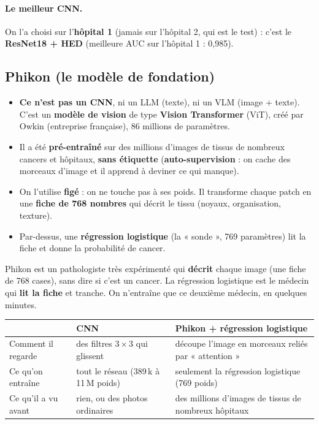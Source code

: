 \documentclass[11pt,a4paper]{article}
\begin{document}
\paragraph{Le meilleur CNN.} On l'a choisi sur l'\textbf{hôpital 1} (jamais sur l'hôpital 2, qui est le test) : c'est le
\textbf{ResNet18 + HED} (meilleure AUC sur l'hôpital 1 : 0,985).

\subsection{Phikon (le modèle de fondation)}
\begin{itemize}
  \item \textbf{Ce n'est pas un CNN}, ni un LLM (texte), ni un VLM (image + texte). C'est un \textbf{modèle de vision} de type
        \textbf{Vision Transformer} (ViT), créé par Owkin (entreprise française), 86 millions de paramètres.
  \item Il a été \textbf{pré-entraîné} sur des millions d'images de tissus de nombreux cancers et hôpitaux, \textbf{sans étiquette}
        (\textbf{auto-supervision} : on cache des morceaux d'image et il apprend à deviner ce qui manque).
  \item On l'utilise \textbf{figé} : on ne touche pas à ses poids. Il transforme chaque patch en une \textbf{fiche de 768 nombres}
        qui décrit le tissu (noyaux, organisation, texture).
  \item Par-dessus, une \textbf{régression logistique} (la « sonde », 769 paramètres) lit la fiche et donne la probabilité de cancer.
\end{itemize}

\begin{analogie}
Phikon est un pathologiste très expérimenté qui \textbf{décrit} chaque image (une fiche de 768 cases), sans dire si c'est un cancer.
La régression logistique est le médecin qui \textbf{lit la fiche} et tranche. On n'entraîne que ce deuxième médecin, en quelques minutes.
\end{analogie}

\begin{table}[H]
\centering\small
\begin{tabularx}{\textwidth}{lXX}
\toprule
 & \textbf{CNN} & \textbf{Phikon + régression logistique} \\
\midrule
Comment il regarde & des filtres $3\times3$ qui glissent & découpe l'image en morceaux reliés par « attention » \\
Ce qu'on entraîne & tout le réseau (389\,k à 11\,M poids) & seulement la régression logistique (769 poids) \\
Ce qu'il a vu avant & rien, ou des photos ordinaires & des millions d'images de tissus de nombreux hôpitaux \\
\bottomrule
\end{tabularx}
\end{table}
\end{document}
